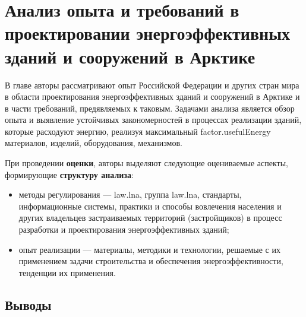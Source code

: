 \chapter{Анализ опыта и требований в проектировании энергоэффективных зданий и сооружений в Арктике}
В главе авторы рассматривают опыт Российской Федерации и других стран мира в области проектирования энергоэффективных зданий и сооружений в Арктике и в части требований, предявляемых к таковым.
Задачами анализа является обзор опыта и выявление устойчивых закономерностей в процессах реализации зданий, которые расходуют энергию, реализуя максимальный \gls{factor.usefulEnergy} материалов, изделий, оборудования, механизмов.

При проведении \textbf{оценки}, авторы выделяют следующие оцениваемые аспекты, формирующие \textbf{структуру анализа}:
\begin{itemize}
    \item методы регулирования --- \gls{law.lna}, группа \gls{law.lna}, стандарты, информационные системы,
    практики и способы вовлечения населения и других владельцев застраиваемых территорий (застройщиков) в процесс разработки и проектирования энергоэффективных зданий;
    \item опыт реализации --- материалы, методики и технологии, решаемые с их применением задачи строительства и обеспечения энергоэффективности, тенденции их применения. %
\end{itemize}


\providecommand{\scAssesmentHeader}[1]
{\textbf{Оценка опыта и требований в проектировании энергоэффективных зданий #1}}
\providecommand{\scAssesmentBuildingClass}{Модельные классы застройки}
\providecommand{\scAssesmentBuildingMetrics}{Модельные метрики потребления энергии}
\providecommand{\scAssesmentExp}{Опыт реализации зданий}
\providecommand{\scAssesmentBuildingLaw}{Методы регулирования}










\section{\textbf{Выводы}}

